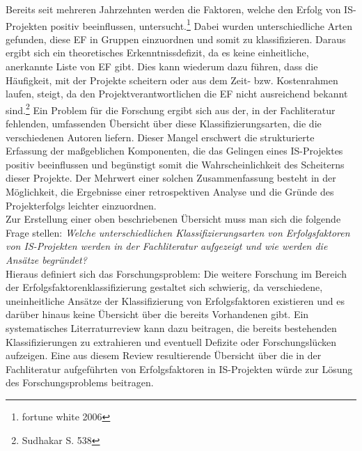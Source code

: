 Bereits seit mehreren Jahrzehnten werden die Faktoren, welche den Erfolg von IS-Projekten positiv beeinflussen, untersucht.\footnote{fortune white 2006}
Dabei wurden unterschiedliche Arten gefunden, diese \ac{EF} in Gruppen einzuordnen und somit zu klassifizieren.
Daraus ergibt sich ein theoretisches Erkenntnissdefizit, da es keine einheitliche, anerkannte Liste von \ac{EF} gibt. Dies kann wiederum dazu führen, dass
die Häufigkeit, mit der Projekte scheitern oder aus dem Zeit- bzw. Kostenrahmen laufen, steigt, da den Projektverantwortlichen die \ac{EF} nicht ausreichend bekannt sind.\footnote{Sudhakar S. 538}
Ein Problem für die Forschung ergibt sich aus der, in der Fachliteratur fehlenden, umfassenden Übersicht über diese Klassifizierungsarten, die die verschiedenen Autoren liefern.
Dieser Mangel erschwert die strukturierte Erfassung der maßgeblichen Komponenten, die das Gelingen eines IS-Projektes positiv beeinflussen und begünstigt somit die Wahrscheinlichkeit des Scheiterns dieser Projekte.
Der Mehrwert einer solchen Zusammenfassung besteht in der Möglichkeit, die Ergebnisse einer retrospektiven Analyse und die Gründe des Projekterfolgs leichter einzuordnen.
\\Zur Erstellung einer oben beschriebenen Übersicht muss man sich die folgende Frage stellen:
\textit{Welche unterschiedlichen Klassifizierungsarten von Erfolgsfaktoren von IS-Projekten werden in der Fachliteratur aufgezeigt und wie werden die Ansätze begründet?}\\
Hieraus definiert sich das Forschungsproblem:
Die weitere Forschung im Bereich der Erfolgsfaktorenklassifizierung gestaltet sich schwierig, da
verschiedene, uneinheitliche Ansätze der Klassifizierung von Erfolgsfaktoren existieren und es darüber hinaus keine Übersicht über die bereits  Vorhandenen gibt.
Ein systematisches Literraturreview kann dazu beitragen, die bereits bestehenden Klassifizierungen zu extrahieren 
und eventuell Defizite oder Forschungslücken aufzeigen.
Eine aus diesem Review resultierende Übersicht über die in der Fachliteratur aufgeführten \KAS von 
Erfolgsfaktoren in IS-Projekten würde zur Lösung des Forschungsproblems beitragen.